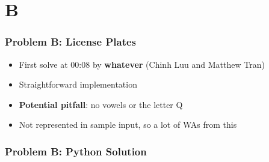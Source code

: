 \section{B}%
\label{sec:b}

\begin{frame}
  \frametitle{Problem B: License Plates}

  \begin{itemize}
    \item First solve at 00:08 by \textbf{whatever} (Chinh Luu and Matthew Tran)
    \item Straightforward implementation
    \item \textbf{Potential pitfall}: no vowels or the letter Q
    \item Not represented in sample input, so a lot of WAs from this
  \end{itemize}
\end{frame}

\begin{frame}
  \frametitle{Problem B: Python Solution}
\end{frame}
